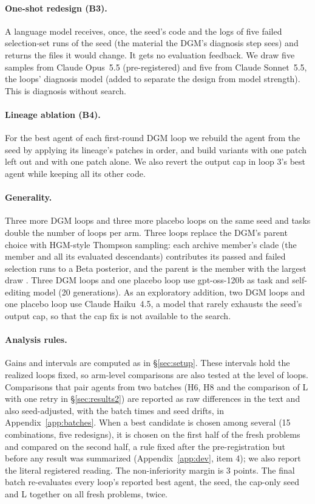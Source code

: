 \paragraph{One-shot redesign (B3).} A language model receives, once, the seed's code and the logs of five failed
selection-set runs of the seed (the material the DGM's diagnosis step sees) and returns the files it would change. It gets no evaluation
feedback. We draw five samples from Claude Opus~5.5 (pre-registered) and five from Claude Sonnet~5.5, the loops'
diagnosis model (added to separate the design from model strength). This is diagnosis without search.

\paragraph{Lineage ablation (B4).} For the best agent of each first-round DGM loop we rebuild the agent from the seed by
applying its lineage's patches in order, and build variants with one patch left out and with one patch alone. We
also revert the output cap in loop 3's best agent while keeping all its other code.

\paragraph{Generality.} Three more DGM loops and three more placebo loops on the same seed and tasks double the number of
loops per arm. Three loops replace the DGM's parent choice with HGM-style Thompson sampling: each archive member's
clade (the member and all its evaluated descendants) contributes its passed and failed selection runs to a Beta
posterior, and the parent is the member with the largest draw \citep{wang2026hgm}. Three DGM loops and one placebo loop
use gpt-oss-120b as task and self-editing model (20 generations). As an exploratory addition, two DGM loops and one
placebo loop use Claude Haiku~4.5, a model that rarely exhausts the seed's output cap, so that the cap fix is not
available to the search.

\paragraph{Analysis rules.} Gains and intervals are computed as in \S\ref{sec:setup}. These intervals hold the
realized loops fixed, so arm-level comparisons are also tested at the level of loops. Comparisons that pair agents from two batches (H6, H8 and the comparison of L with one retry in
\S\ref{sec:results2}) are reported as raw differences in the text and also seed-adjusted, with the batch times and seed
drifts, in Appendix~\ref{app:batches}. When a best candidate is chosen among several (15 combinations, five redesigns),
it is chosen on the first half of the fresh problems and compared on the second half, a rule fixed after the pre-registration
but before any result was summarized (Appendix~\ref{app:dev}, item 4); we also report the literal registered reading. The non-inferiority margin is
3 points. The final batch re-evaluates every loop's reported best agent, the seed, the cap-only seed and L
together on all fresh problems, twice.

